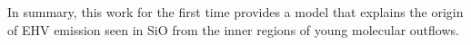 \documentclass[useAMS,usenatbib]{mn2e}
\begin{document}
In summary, this work for the first time provides a model
that explains the origin of EHV emission seen in SiO from 
the inner regions of young molecular outflows.





\label{lastpage}
\end{document}
